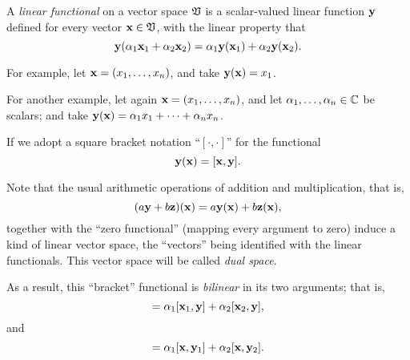 A {\em linear functional}
on a vector space ${\frak V}$ is a scalar-valued linear function ${\bf y}$
defined for every vector   ${\bf x} \in {\frak V}$, with the linear property that
\begin{equation}
{\bf y} (\alpha_1 {\bf x}_1 +\alpha_2 {\bf x}_2)
=
\alpha_1 {\bf y} ({\bf x}_1) +\alpha_2 {\bf y} ({\bf x}_2) .
\end{equation}

{\color{blue}
\bexample
For example,
let ${\bf x} = (x_1,\ldots , x_n)$, and
take
${\bf y} ({\bf x}) =x_1$.

For another example,
let again ${\bf x} = (x_1,\ldots , x_n)$, and
let $\alpha_1,\ldots , \alpha_n \in {\Bbb C}$ be scalars; and
take
${\bf y} ({\bf x}) =\alpha_1 x_1 + \cdots +\alpha_n x_n$.
\eexample
}


If we adopt a square bracket notation ``$[\cdot , \cdot ]$''
for the functional
\begin{equation}
{\bf y} ({\bf x})
=
[{\bf x},{\bf y}].
\end{equation}

Note that the usual arithmetic operations of addition and multiplication,
that is,
\begin{equation}
(a {\bf y} + b {\bf z}) ({\bf x})
=
a {\bf y} ({\bf x}) + b {\bf z} ({\bf x}) ,
\end{equation}
together with the ``zero functional''
(mapping every argument to zero)
induce a kind of linear vector space, the ``vectors''
being identified with the linear functionals.
This vector space will be called {\em dual space}.


As a result, this ``bracket'' functional is
{\em bilinear} in its two arguments; that is,
\begin{equation}
[ \alpha_1 {\bf x}_1 +\alpha_2 {\bf x}_2, {\bf y}]
=
\alpha_1 [{\bf x}_1 ,{\bf y}]  +\alpha_2  [{\bf x}_2,{\bf y}],
\end{equation}
and
\begin{equation}
[
{\bf x}, \alpha_1 {\bf y}_1 +\alpha_2 {\bf y}_2
]
=
\alpha_1
[{\bf x},{\bf y}_1 ]
+
\alpha_2
[{\bf x},{\bf y}_2].
\end{equation}


